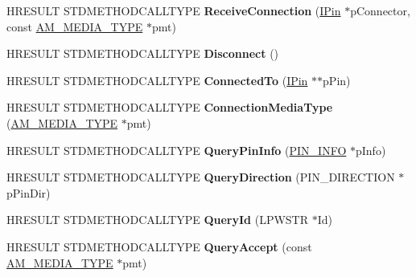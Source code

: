 \begin{DoxyCompactItemize}
\item 
\mbox{\label{class_c_input_pin_a7047d644d3bc49ec3dcd1c2852a2654c}} 
H\+R\+E\+S\+U\+LT S\+T\+D\+M\+E\+T\+H\+O\+D\+C\+A\+L\+L\+T\+Y\+PE {\bfseries Receive\+Connection} (\hyperlink{interface_i_pin}{I\+Pin} $\ast$p\+Connector, const \hyperlink{struct_a_m___m_e_d_i_a___t_y_p_e}{A\+M\+\_\+\+M\+E\+D\+I\+A\+\_\+\+T\+Y\+PE} $\ast$pmt)
\item 
\mbox{\label{class_c_input_pin_a20817e553017b370ee9509a42bb2db0d}} 
H\+R\+E\+S\+U\+LT S\+T\+D\+M\+E\+T\+H\+O\+D\+C\+A\+L\+L\+T\+Y\+PE {\bfseries Disconnect} ()
\item 
\mbox{\label{class_c_input_pin_af476f0a3a618de9533a425f82f656e18}} 
H\+R\+E\+S\+U\+LT S\+T\+D\+M\+E\+T\+H\+O\+D\+C\+A\+L\+L\+T\+Y\+PE {\bfseries Connected\+To} (\hyperlink{interface_i_pin}{I\+Pin} $\ast$$\ast$p\+Pin)
\item 
\mbox{\label{class_c_input_pin_aa2707b846eb09ca9c84a198dbd7f0c58}} 
H\+R\+E\+S\+U\+LT S\+T\+D\+M\+E\+T\+H\+O\+D\+C\+A\+L\+L\+T\+Y\+PE {\bfseries Connection\+Media\+Type} (\hyperlink{struct_a_m___m_e_d_i_a___t_y_p_e}{A\+M\+\_\+\+M\+E\+D\+I\+A\+\_\+\+T\+Y\+PE} $\ast$pmt)
\item 
\mbox{\label{class_c_input_pin_a0c35910de2d9ac83906423d7327d2a1e}} 
H\+R\+E\+S\+U\+LT S\+T\+D\+M\+E\+T\+H\+O\+D\+C\+A\+L\+L\+T\+Y\+PE {\bfseries Query\+Pin\+Info} (\hyperlink{struct_i_pin_1_1___pin_info}{P\+I\+N\+\_\+\+I\+N\+FO} $\ast$p\+Info)
\item 
\mbox{\label{class_c_input_pin_a7403559832fa23d3007b46cdcc6fbc69}} 
H\+R\+E\+S\+U\+LT S\+T\+D\+M\+E\+T\+H\+O\+D\+C\+A\+L\+L\+T\+Y\+PE {\bfseries Query\+Direction} (P\+I\+N\+\_\+\+D\+I\+R\+E\+C\+T\+I\+ON $\ast$p\+Pin\+Dir)
\item 
\mbox{\label{class_c_input_pin_a33f1512df1abefac6be46d32b62f23e7}} 
H\+R\+E\+S\+U\+LT S\+T\+D\+M\+E\+T\+H\+O\+D\+C\+A\+L\+L\+T\+Y\+PE {\bfseries Query\+Id} (L\+P\+W\+S\+TR $\ast$Id)
\item 
\mbox{\label{class_c_input_pin_a3172b14d637c842355df02d7fbb53089}} 
H\+R\+E\+S\+U\+LT S\+T\+D\+M\+E\+T\+H\+O\+D\+C\+A\+L\+L\+T\+Y\+PE {\bfseries Query\+Accept} (const \hyperlink{struct_a_m___m_e_d_i_a___t_y_p_e}{A\+M\+\_\+\+M\+E\+D\+I\+A\+\_\+\+T\+Y\+PE} $\ast$pmt)
$$
\end{DoxyCompactItemize}
